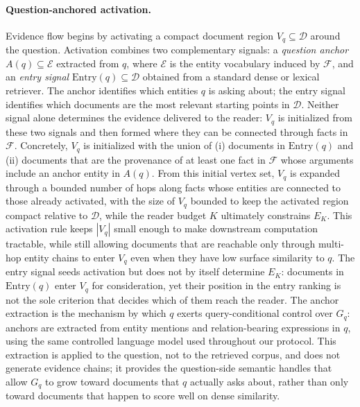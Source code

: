 \paragraph{Question-anchored activation.}
\label{sec:method:anchor}
Evidence flow begins by activating a compact document region
$V_q \subseteq \mathcal{D}$ around the question. Activation combines two
complementary signals: a \emph{question anchor} $A(q) \subseteq \mathcal{E}$
extracted from $q$, where $\mathcal{E}$ is the entity vocabulary induced by
$\mathcal{F}$, and an \emph{entry signal} $\mathrm{Entry}(q) \subseteq
\mathcal{D}$ obtained from a standard dense or lexical retriever. The
anchor identifies which entities $q$ is asking about; the entry signal
identifies which documents are the most relevant starting points in
$\mathcal{D}$. Neither signal alone determines the evidence delivered to
the reader: $V_q$ is initialized from these two signals and then formed
where they can be connected through facts in $\mathcal{F}$. Concretely,
$V_q$ is initialized with the union of (i) documents in $\mathrm{Entry}(q)$
and (ii) documents that are the provenance of at least one fact in
$\mathcal{F}$ whose arguments include an anchor entity in $A(q)$. From this
initial vertex set, $V_q$ is expanded through a bounded number of hops
along facts whose entities are connected to those already activated, with
the size of $V_q$ bounded to keep the activated region compact relative to
$\mathcal{D}$, while the reader budget $K$ ultimately constrains $E_K$.
This activation rule keeps $|V_q|$ small enough to make downstream
computation tractable, while still allowing documents that are reachable
only through multi-hop entity chains to enter $V_q$ even when they have
low surface similarity to $q$. The entry signal seeds activation but does
not by itself determine $E_K$: documents in $\mathrm{Entry}(q)$ enter
$V_q$ for consideration, yet their position in the entry ranking is not
the sole criterion that decides which of them reach the reader. The anchor
extraction is the mechanism by which $q$ exerts query-conditional control
over $G_q$: anchors are extracted from entity mentions and relation-bearing
expressions in $q$, using the same controlled language model used
throughout our protocol. This extraction is applied to the question, not
to the retrieved corpus, and does not generate evidence chains; it provides
the question-side semantic handles that allow $G_q$ to grow toward
documents that $q$ actually asks about, rather than only toward documents
that happen to score well on dense similarity.


